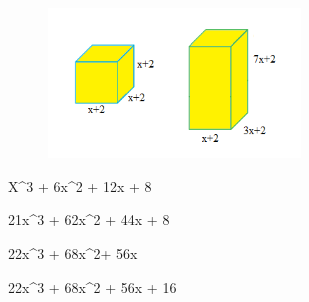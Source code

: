 \begin{figure}[H]
\centering\includegraphics[width=2.63333in,height=1.56545in]{./imgSAEB_8_MAT/media/image55.png}
\end{figure}
\item X^3 + 6x^2 + 12x + 8
\item 21x^3 + 62x^2 + 44x + 8
\item 22x^3 + 68x^2+ 56x
\item 22x^3 + 68x^2 + 56x + 16



















